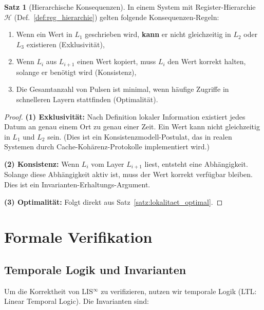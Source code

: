\documentclass[a4paper,12pt]{article}
\theoremstyle{definition}
\newtheorem{satz}{Satz}
\begin{document}
\begin{satz}[Hierarchische Konsequenzen]
	\label{satz:hierarchische_konsequenzen}
	In einem System mit Register-Hierarchie $\mathcal{H}$ (Def.~\ref{def:reg_hierarchie}) gelten folgende Konsequenzen-Regeln:
	\begin{enumerate}
		\item Wenn ein Wert in $L_1$ geschrieben wird, \textbf{kann} er nicht gleichzeitig in $L_2$ oder $L_3$ existieren (Exklusivität),
		\item Wenn $L_i$ aus $L_{i+1}$ einen Wert kopiert, muss $L_i$ den Wert korrekt halten, solange er benötigt wird (Konsistenz),
		\item Die Gesamtanzahl von Pulsen ist minimal, wenn häufige Zugriffe in schnelleren Layern stattfinden (Optimalität).
	\end{enumerate}
\end{satz}

\begin{proof}
	\textbf{(1) Exklusivität:} Nach Definition lokaler Information existiert jedes Datum an genau einem Ort zu genau einer Zeit. Ein Wert kann nicht gleichzeitig in $L_1$ und $L_2$ sein. (Dies ist ein Konsistenzmodell-Postulat, das in realen Systemen durch Cache-Kohärenz-Protokolle implementiert wird.)
	
	\textbf{(2) Konsistenz:} Wenn $L_i$ vom Layer $L_{i+1}$ liest, entsteht eine Abhängigkeit. Solange diese Abhängigkeit aktiv ist, muss der Wert korrekt verfügbar bleiben. Dies ist ein Invarianten-Erhaltungs-Argument.
	
	\textbf{(3) Optimalität:} Folgt direkt aus Satz~\ref{satz:lokalitaet_optimal}.
\end{proof}

\section{Formale Verifikation}

\subsection{Temporale Logik und Invarianten}

Um die Korrektheit von LIS$^{\infty}$ zu verifizieren, nutzen wir temporale Logik (LTL: Linear Temporal Logic). Die Invarianten sind:
\end{document}
